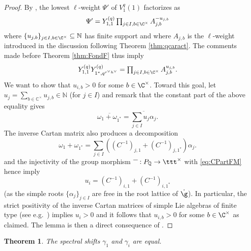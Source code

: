 \documentclass[11pt]{amsart}
\newtheorem{theorem}{Theorem}[section]
\theoremstyle{definition}
\theoremstyle{remark}
\numberwithin{equation}{section}
\begin{document}
\begin{proof} By \cite[Theorem 4.1]{fm}, the lowest $\ell$-weight $\Psi'$ of $V_1^q(1)$ factorizes as $$\textstyle \Psi' = Y_{1,1}^{(q)} \prod_{j\in I, b\in \C^{\times}} A_{j,b}^{-u_{j,b}}$$ where $\{u_{j,b}\}_{j\in I,b\in\C^{\times}}\subseteq \mathbb{N}$ has finite support and where $A_{j,b}$ is the $\ell$-weight introduced in the discussion following Theorem \ref{thm:qcaract}. The comments made before Theorem \ref{thm:FondF} thus imply
$$ \textstyle Y_{1,1}^{(q)} Y_{1^*,q^{r^{\vee}h^{\vee}}}^{(q)} = \prod_{j\in I,b\in \C^{\times}}A_{j,b}^{u_{j,b}}. $$
We want to show that $u_{i,b}> 0$ for some $b \in \C^{\times}$. Toward this goal, let $u_j = \sum_{b\in \mathbb{C}^{\times}} u_{j,b}\in \mathbb{N}$ (for $j\in I$) and remark that the constant part of the above equality gives 
\begin{equation}\label{eq:CPartFM} 
\textstyle \overline{\omega_1+\omega_{1^*}} = \overline{\sum_{j\in I} u_j\alpha_j}.
\end{equation}
The inverse Cartan matrix also produces a decomposition
$$\textstyle \omega_1+\omega_{1^*} = \sum_{j\in I}((C^{-1})_{j,1}+(C^{-1})_{j,1^{*}})\alpha_j.$$
and the injectivity of the group morphism $\overline{\textcolor{white}{\alpha}}:P_{\mathbb{Q}}\rightarrow \ttt^{\times}$ with \eqref{eq:CPartFM} hence imply $$u_i = (C^{-1})_{i,1}+(C^{-1})_{i,1^*}$$
(as the simple roots $\{\alpha_j\}_{j\in I}$ are free in the root lattice of $\dot{\g}$). In particular, the strict positivity of the inverse Cartan matrices of simple Lie algebras of finite type (see e.g.~\cite{wz}) implies $u_i>0$ and it follows that $u_{i,b} > 0$ for some $b\in \C^{\times}$ as claimed. The lemma is then a direct consequence of \cite[Lemma 2.6 and Theorem 6.7]{fm}.
\end{proof}
\begin{theorem}\label{thm:SpecShiftEq} The spectral shifts $\gamma_1$ and $\gamma_i$ are equal. 
\end{theorem}
\end{document}
